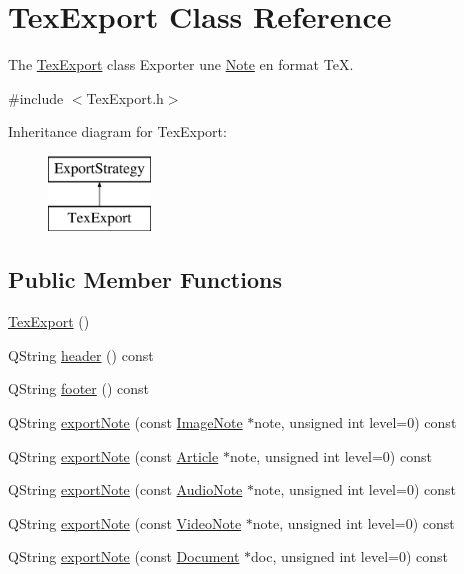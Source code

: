 \hypertarget{class_tex_export}{\section{Tex\-Export Class Reference}
\label{class_tex_export}
}


The \hyperlink{class_tex_export}{Tex\-Export} class Exporter une \hyperlink{class_note}{Note} en format Te\-X.  




{\ttfamily \#include $<$Tex\-Export.\-h$>$}

Inheritance diagram for Tex\-Export\-:\begin{figure}[H]
\begin{center}
\leavevmode
\includegraphics[height=2.000000cm]{class_tex_export}
\end{center}
\end{figure}
\subsection*{Public Member Functions}
\begin{DoxyCompactItemize}
\item 
\hyperlink{class_tex_export_ae8b5d004113eb847e6f4e72c19b377a3}{Tex\-Export} ()
\item 
Q\-String \hyperlink{class_tex_export_a7e5cdd026ffef6a5054cf41340654d1c}{header} () const 
\item 
Q\-String \hyperlink{class_tex_export_a87a2dfd20909b2324b055121e23c2041}{footer} () const 
\item 
Q\-String \hyperlink{class_tex_export_ac6178ab27612e194974d090e1fddc802}{export\-Note} (const \hyperlink{class_image_note}{Image\-Note} $\ast$note, unsigned int level=0) const 
\item 
Q\-String \hyperlink{class_tex_export_a563e0bb31e4b0452ad7dbfd85ec360b6}{export\-Note} (const \hyperlink{class_article}{Article} $\ast$note, unsigned int level=0) const 
\item 
Q\-String \hyperlink{class_tex_export_ac862ce725a659df0f4fd1fc485633762}{export\-Note} (const \hyperlink{class_audio_note}{Audio\-Note} $\ast$note, unsigned int level=0) const 
\item 
Q\-String \hyperlink{class_tex_export_af41d231ab3cccee2b6c3505e68e93e42}{export\-Note} (const \hyperlink{class_video_note}{Video\-Note} $\ast$note, unsigned int level=0) const 
\item 
Q\-String \hyperlink{class_tex_export_a3b5cbbb27ac74f0213e573803414dc26}{export\-Note} (const \hyperlink{class_document}{Document} $\ast$doc, unsigned int level=0) const 
\end{DoxyCompactItemize}
